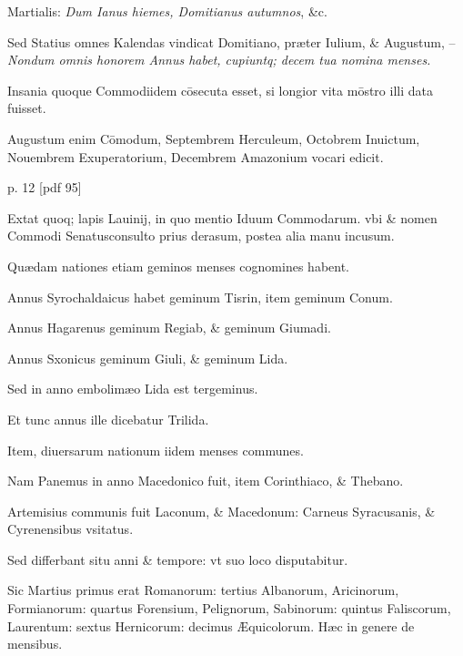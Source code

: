 \begin{parnumbers}
Martialis:
 \textit{Dum Ianus hiemes, Domitianus
autumnos}, \&c.

Sed Statius omnes
Kalendas vindicat Domitiano,
præter Iulium, \& Augustum,
– \textit{Nondum omnis honorem
Annus habet, cupiuntq; decem tua
nomina menses.}

Insania quoque
Commodiidem cōsecuta esset, si
longior vita mōstro illi data fuisset.

Augustum enim Cōmodum,
Septembrem Herculeum, Octobrem
Inuictum, Nouembrem
Exuperatorium, Decembrem
Amazonium vocari edicit.

\end{parnumbers}
\clearpage
p. 12 [pdf 95]
\begin{parnumbers}

Extat
quoq; lapis Lauinij, in quo mentio
Iduum Commodarum. vbi \&
nomen  Commodi Senatusconsulto prius derasum, postea alia manu
incusum.

 Quædam nationes etiam geminos menses cognomines habent.

Annus Syrochaldaicus habet geminum Tisrin, item geminum Conum.

Annus Hagarenus geminum Regiab, \& geminum Giumadi.

Annus Sxonicus geminum Giuli, \& geminum Lida.

Sed in
anno embolimæo Lida est tergeminus.

Et tunc annus ille dicebatur
Trilida.

Item, diuersarum nationum iidem menses communes.

Nam
Panemus in anno Macedonico fuit, item Corinthiaco, \& Thebano.

Artemisius communis fuit Laconum, \& Macedonum: Carneus Syracusanis,
\& Cyrenensibus vsitatus.

Sed differbant situ anni \& tempore:
vt suo loco disputabitur.

Sic Martius primus erat  Romanorum:
tertius Albanorum, Aricinorum, Formianorum: quartus Forensium,
Pelignorum, Sabinorum: quintus Faliscorum, Laurentum:
sextus Hernicorum: decimus Æquicolorum. Hæc in genere
de mensibus.

\end{parnumbers}

